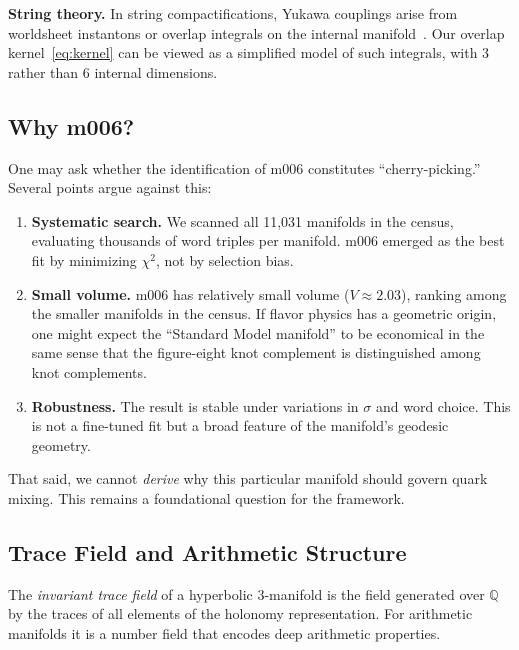 \documentclass[11pt,a4paper]{article}
\begin{document}
\textbf{String theory.} In string compactifications, Yukawa couplings 
arise from worldsheet instantons or overlap integrals on the internal 
manifold~\cite{Ibanez2012}. Our overlap kernel~\eqref{eq:kernel} can 
be viewed as a simplified model of such integrals, with 3 rather than 
6 internal dimensions.

\subsection{Why m006?}
\label{subsec:why_m006}

One may ask whether the identification of m006 constitutes 
``cherry-picking.'' Several points argue against this:

\begin{enumerate}
\item \textbf{Systematic search.} We scanned all 11,031 manifolds in 
the census, evaluating thousands of word triples per manifold. m006 
emerged as the best fit by minimizing $\chi^2$, not by selection bias.

\item \textbf{Small volume.} m006 has relatively small volume 
($V \approx 2.03$), ranking among the smaller manifolds in the census. 
If flavor physics has a geometric origin, one might expect the 
``Standard Model manifold'' to be economical in the same sense that 
the figure-eight knot complement is distinguished among knot complements.

\item \textbf{Robustness.} The result is stable under variations in 
$\sigma$ and word choice. This is not a fine-tuned fit but a broad 
feature of the manifold's geodesic geometry.
\end{enumerate}

That said, we cannot \emph{derive} why this particular manifold should 
govern quark mixing. This remains a foundational question for the 
framework.



\subsection{Trace Field and Arithmetic Structure}
\label{subsec:trace_field}

The \emph{invariant trace field} of a hyperbolic 3-manifold is the
field generated over $\mathbb{Q}$ by the traces of all elements of
the holonomy representation. For arithmetic manifolds it is a number
field that encodes deep arithmetic properties.
\end{document}
